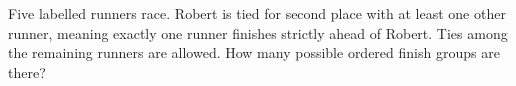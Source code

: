 Five labelled runners race. Robert is tied for second place with at least one other runner, meaning exactly one runner finishes strictly ahead of Robert. Ties among the remaining runners are allowed. How many possible ordered finish groups are there?
